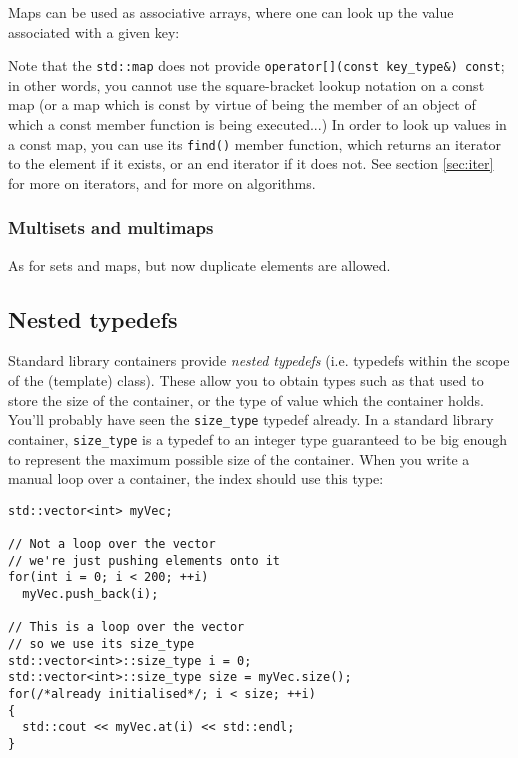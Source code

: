 \documentclass[a4paper]{scrartcl}
\begin{document}
Maps can be used as associative arrays, where one can look up the value associated with a given key:


Note that the \verb|std::map| does not provide \verb|operator[](const key_type&) const|; in other words, you cannot use the square-bracket lookup notation on a const map (or a map which is const by virtue of being the member of an object of which a const member function is being executed...) In order to look up values in a const map, you can use its \verb|find()| member function, which returns an iterator to the element if it exists, or an end iterator if it does not. See section \ref{sec:iter} for more on iterators, and\cite{StandardLibrary} for more on algorithms.



\subsubsection{Multisets and multimaps}\label{sec:containers_associative_multi}
As for sets and maps, but now duplicate elements are allowed.

\subsection{Nested typedefs}
Standard library containers provide \emph{nested typedefs} (i.e. typedefs within the scope of the (template) class). These allow you to obtain types such as that used to store the size of the container, or the type of value which the container holds. You'll probably have seen the \verb|size_type| typedef already. In a standard library container, \verb|size_type| is a typedef to an integer type guaranteed to be big enough to represent the maximum possible size of the container. When you write a manual loop over a container, the index should use this type:

\begin{verbatim}
std::vector<int> myVec;

// Not a loop over the vector
// we're just pushing elements onto it
for(int i = 0; i < 200; ++i)
  myVec.push_back(i);

// This is a loop over the vector
// so we use its size_type
std::vector<int>::size_type i = 0;
std::vector<int>::size_type size = myVec.size();
for(/*already initialised*/; i < size; ++i)
{
  std::cout << myVec.at(i) << std::endl;
}
\end{verbatim}
\end{document}
